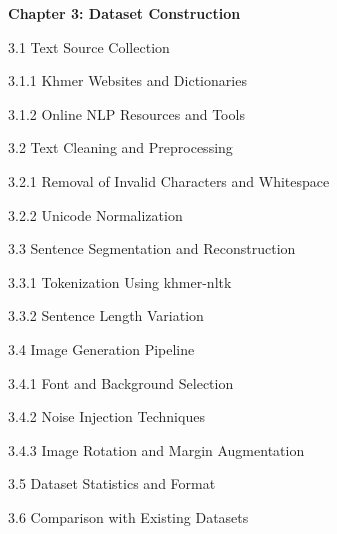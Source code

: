 \begin{adjustwidth}{0.2cm}{0.2cm}
    \vspace{0.5cm}
    {\large \textbf{Chapter 3: Dataset Construction}\dotfill\pageref{ch:dataset}\par}
    {\large 3.1 Text Source Collection\dotfill\pageref{sec:text-source}\par}
    {\large \hspace{1cm}3.1.1 Khmer Websites and Dictionaries\dotfill\pageref{subsec:websites}\par}
    {\large \hspace{1cm}3.1.2 Online NLP Resources and Tools\dotfill\pageref{subsec:nlp-tools}\par}
    {\large 3.2 Text Cleaning and Preprocessing\dotfill\pageref{sec:preprocessing}\par}
    {\large \hspace{1cm}3.2.1 Removal of Invalid Characters and Whitespace\dotfill\pageref{subsec:cleaning}\par}
    {\large \hspace{1cm}3.2.2 Unicode Normalization\dotfill\pageref{subsec:unicode}\par}
    {\large 3.3 Sentence Segmentation and Reconstruction\dotfill\pageref{sec:segmentation}\par}
    {\large \hspace{1cm}3.3.1 Tokenization Using khmer-nltk\dotfill\pageref{subsec:tokenization}\par}
    {\large \hspace{1cm}3.3.2 Sentence Length Variation\dotfill\pageref{subsec:length}\par}
    {\large 3.4 Image Generation Pipeline\dotfill\pageref{sec:generation}\par}
    {\large \hspace{1cm}3.4.1 Font and Background Selection\dotfill\pageref{subsec:fonts}\par}
    {\large \hspace{1cm}3.4.2 Noise Injection Techniques\dotfill\pageref{subsec:noise}\par}
    {\large \hspace{1cm}3.4.3 Image Rotation and Margin Augmentation\dotfill\pageref{subsec:augmentation}\par}
    {\large 3.5 Dataset Statistics and Format\dotfill\pageref{sec:statistics}\par}
    {\large 3.6 Comparison with Existing Datasets\dotfill\pageref{sec:comparison}\par}


\end{adjustwidth}
